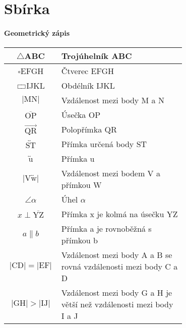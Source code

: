 \chapter{Sbírka}

\subsubsection{Geometrický zápis}
\begin{tabular}{|c|p{0.7\linewidth}|}
    \hline
    $\triangle$ABC                                         & Trojúhelník ABC                                                     \\ \hline
    $\square$EFGH                                          & Čtverec EFGH                                                        \\ \hline
    $\rectangle$IJKL                                       & Obdélník IJKL                                                       \\ \hline
    $\lvert \text{MN} \rvert$                              & Vzdálenost mezi body M a N                                          \\ \hline
    $\overline{\text{OP}}$                                 & Úsečka OP                                                           \\ \hline
    $\overrightarrow{\text{QR}}$                           & Polopřímka QR                                                       \\ \hline
    $\overleftrightarrow{\text{ST}}$                       & Přímka určená body ST                                               \\ \hline
    $\overleftrightarrow{\text{u}}$                        & Přímka u                                                            \\ \hline
    $\lvert \text{V} \overleftrightarrow{\text{w}} \rvert$ & Vzdálenost mezi bodem V a přímkou W                                 \\ \hline
    $\angle \alpha $                                       & Úhel $\alpha$                                                       \\ \hline
    $ x \perp \overline{\text{YZ}} $                       & Přímka x je kolmá na úsečku YZ                                      \\ \hline
    $a \| b$                                               & Přímka a je rovnoběžná s přímkou b                                  \\ \hline
    $\lvert \text{CD} \rvert = \lvert \text{EF} \rvert$    & Vzdálenost mezi body A a B se rovná vzdálenosti mezi body C a D     \\ \hline
    $\lvert \text{GH} \rvert > \lvert \text{IJ} \rvert$    & Vzdálenost mezi body G a H je větší než vzdálenosti mezi body I a J \\ \hline
\end{tabular}

\newpage
